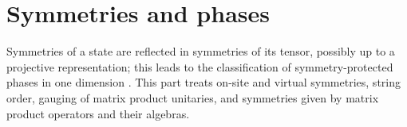 \part{Symmetries and phases}
\label{part:symmetries}

Symmetries of a state are reflected in symmetries of its tensor, possibly up to
a projective representation; this leads to the classification of
symmetry-protected phases in one dimension \cite[Section~III.A]{Cirac2021Matrix}.
This part treats on-site and virtual symmetries, string order, gauging of
matrix product unitaries, and symmetries given by matrix product operators and
their algebras.
